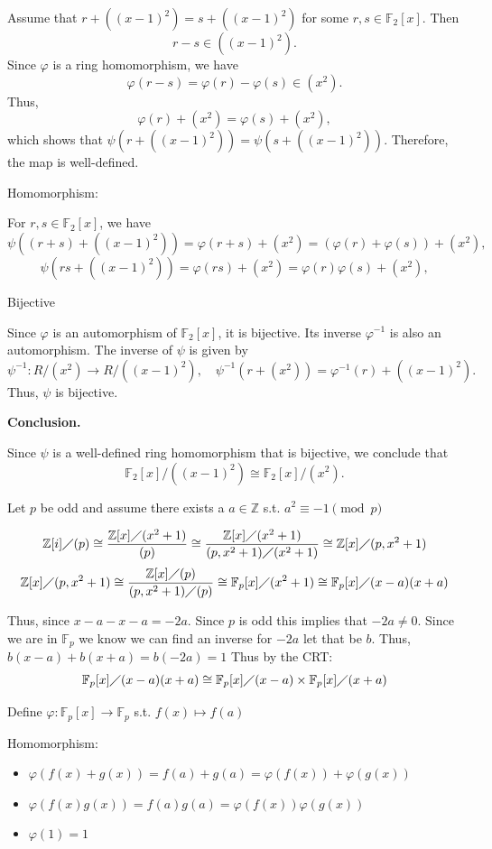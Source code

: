\documentclass[12pt, letterpaper]{article}
\newcommand{\Z}{\mathbb{Z}}
\newcommand{\F}{\mathbb{F}}
\begin{document}
\begin{enumerate}[(a)]
    Assume that \(r + ((x-1)^2) = s + ((x-1)^2)\) for some \(r, s \in \F_2[x]\). Then
    \[
    r - s \in ((x-1)^2).
    \]
    Since \(\varphi\) is a ring homomorphism, we have
    \[
    \varphi(r - s) = \varphi(r) - \varphi(s) \in (x^2).
    \]
    Thus,
    \[
    \varphi(r) + (x^2) = \varphi(s) + (x^2),
    \]
    which shows that \(\psi(r + ((x-1)^2)) = \psi(s + ((x-1)^2))\). Therefore, the map is well-defined.

    Homomorphism:

    For \(r, s \in \F_2[x]\), we have
    \[
    \psi((r+s) + ((x-1)^2)) = \varphi(r+s) + (x^2) = (\varphi(r) + \varphi(s)) + (x^2),
    \]
    \[
    \psi(rs + ((x-1)^2)) = \varphi(rs) + (x^2) = \varphi(r)\varphi(s) + (x^2),
    \]

    Bijective

    Since \(\varphi\) is an automorphism of \(\F_2[x]\), it is bijective. Its inverse \(\varphi^{-1}\) is also an automorphism. The inverse of \(\psi\) is given by
    \[
    \psi^{-1}: R/(x^2) \to R/((x-1)^2), \quad \psi^{-1}(r + (x^2)) = \varphi^{-1}(r) + ((x-1)^2).
    \]
    Thus, \(\psi\) is bijective.

    \textbf{Conclusion.}

    Since \(\psi\) is a well-defined ring homomorphism that is bijective, we conclude that
    \[
    \F_2[x]/((x-1)^2) \cong \F_2[x]/(x^2).
    \]
    
    Let $p$ be odd and assume there exists a $a \in \Z$ s.t. $a^2 \equiv -1 \pmod{p}$

    \[\Z[i]\diagup (p) \cong \dfrac{\Z[x] \diagup (x^2+1)}{(p)} \cong \dfrac{\Z[x] \diagup (x^2+1)}{(p,x^2+1) \diagup (x^2+1)} \cong \Z[x] \diagup (p,x^2+1)\]
    \[\Z[x] \diagup (p,x^2+1) \cong \dfrac{\Z[x] \diagup (p)}{(p,x^2+1) \diagup (p)} \cong \F_p[x] \diagup (x^2+1) \cong \F_p[x] \diagup (x-a)(x+a)\]

    Thus, since $x-a-x-a=-2a$. Since $p$ is odd this implies that $-2a \neq 0$. Since we are in $\F_p$ we know we can find an inverse for $-2a$ let that be $b$. Thus, $b(x-a)+b(x+a)=b(-2a)=1$ Thus by the CRT:
    \[\F_p[x] \diagup (x-a)(x+a) \cong \F_p[x] \diagup (x-a) \times \F_p[x] \diagup (x+a)\]

    Define $\varphi: \F_p[x] \to \F_p$ s.t. $f(x) \mapsto f(a)$

    Homomorphism:

    \begin{itemize}
        \item $\varphi(f(x)+g(x))=f(a)+g(a)=\varphi(f(x))+\varphi(g(x))$
        \item $\varphi(f(x)g(x))=f(a)g(a)=\varphi(f(x))\varphi(g(x))$
        \item $\varphi(1)=1$
    \end{itemize}


\end{enumerate}
\end{document}
